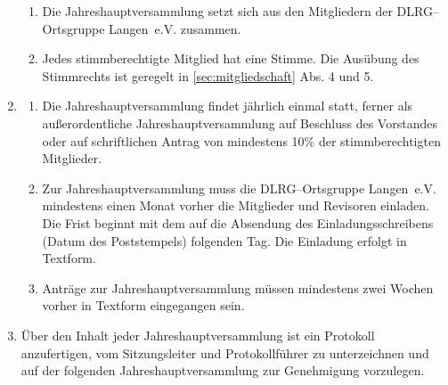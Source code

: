 \documentclass[%
12pt, %
a4paper, %
headsepline, %
parskip, %
headings=normal, %
]{scrreprt}
\begin{document}
\begin{enumerate}
\begin{enumerate}[noitemsep]
        \item Die Jahreshauptversammlung setzt sich aus den Mitgliedern der DLRG--Ortsgruppe Langen~e.V. zusammen.
        \item Jedes stimmberechtigte Mitglied hat eine Stimme. Die Ausübung des Stimmrechts ist geregelt in \ref{sec:mitgliedschaft} Abs. 4 und 5.
      \end{enumerate}
    \item \begin{enumerate}[noitemsep]
        \item Die Jahreshauptversammlung findet jährlich einmal statt, ferner als außerordentliche Jahreshauptversammlung auf Beschluss des Vorstandes oder auf schriftlichen Antrag von mindestens 10\% der stimmberechtigten Mitglieder.
        \item Zur Jahreshauptversammlung muss die DLRG--Ortsgruppe Langen~e.V. mindestens einen Monat vorher die Mitglieder und Revisoren einladen. Die Frist beginnt mit dem auf die Absendung des Einladungsschreibens (Datum des Poststempels) folgenden Tag. Die Einladung erfolgt in Textform.
        \item Anträge zur Jahreshauptversammlung müssen mindestens zwei Wochen vorher in Textform eingegangen sein.
      \end{enumerate}
    \item Über den Inhalt jeder Jahreshauptversammlung ist ein Protokoll anzufertigen, vom Sitzungsleiter und Protokollführer zu unterzeichnen und auf der folgenden Jahreshauptversammlung zur Genehmigung vorzulegen. %
\end{enumerate}
\end{document}

